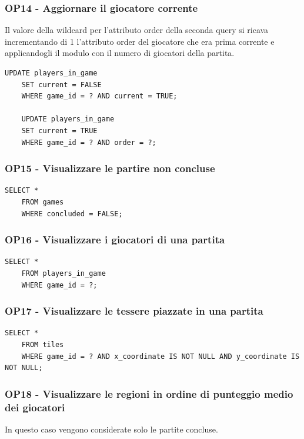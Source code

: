 \subsubsection*{OP14 - Aggiornare il giocatore corrente}
Il valore della wildcard per l'attributo order della seconda query si ricava incrementando di 1 l'attributo order del giocatore che era prima corrente e applicandogli il modulo con il numero di giocatori della partita.
\medskip

\begin{lstlisting}[style=sql]
    UPDATE players_in_game
    SET current = FALSE
    WHERE game_id = ? AND current = TRUE;

    UPDATE players_in_game
    SET current = TRUE
    WHERE game_id = ? AND order = ?;
\end{lstlisting}

\subsubsection*{OP15 - Visualizzare le partire non concluse}
\begin{lstlisting}[style=sql]
    SELECT *
    FROM games
    WHERE concluded = FALSE;
\end{lstlisting}

\subsubsection*{OP16 - Visualizzare i giocatori di una partita}
\begin{lstlisting}[style=sql]
    SELECT *
    FROM players_in_game
    WHERE game_id = ?;
\end{lstlisting}

\subsubsection*{OP17 - Visualizzare le tessere piazzate in una partita}
\begin{lstlisting}[style=sql]
    SELECT *
    FROM tiles
    WHERE game_id = ? AND x_coordinate IS NOT NULL AND y_coordinate IS NOT NULL;
\end{lstlisting}

\subsubsection*{OP18 - Visualizzare le regioni in ordine di punteggio medio dei giocatori}
In questo caso vengono considerate solo le partite concluse.
\medskip

